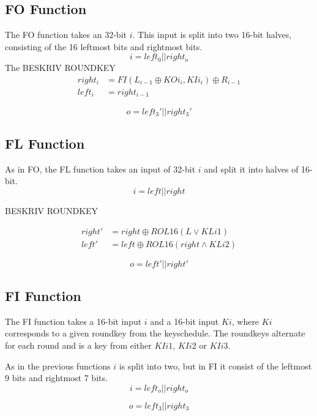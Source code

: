 \subsection{FO Function}
The FO function takes an 32-bit $i$. This input is split into two
16-bit halves, consisting of the 16 leftmost bits and rightmost bits.
\[i = left_0 || right_o\]
The 
BESKRIV ROUNDKEY
\begin{align*}
  right_i &= FI(L_{i-1} \oplus KOi_i, KIi_i) \oplus R_{i - 1}\\
  left_i &= right_{i - 1}
\end{align*}

\[o = left_3' || right_3'\]
\subsection{FL Function}
As in FO, the FL function takes an input of 32-bit $i$ and split it into
halves of 16-bit.
\[i = left || right\]

BESKRIV ROUNDKEY

\begin{align*}
  right' &= right \oplus ROL16(L \lor KLi1)\\
  left' &= left \oplus ROL16(right \land KLi2)
\end{align*}

\[o = left' || right'\]
\subsection{FI Function}
The FI function takes a 16-bit input $i$ and a 16-bit input $Ki$,
where $Ki$ corresponds to a given roundkey from the keyschedule. The
roundkeys alternate for each round and is a key from either $KIi1$, $KIi2$
or $KIi3$.

As in the previous functions $i$ is split into two, but in FI it
consist of the leftmost 9 bits and rightmost 7 bits.
\[ i = left_o || right_o \]


\[o = left_3 || right_3\]
